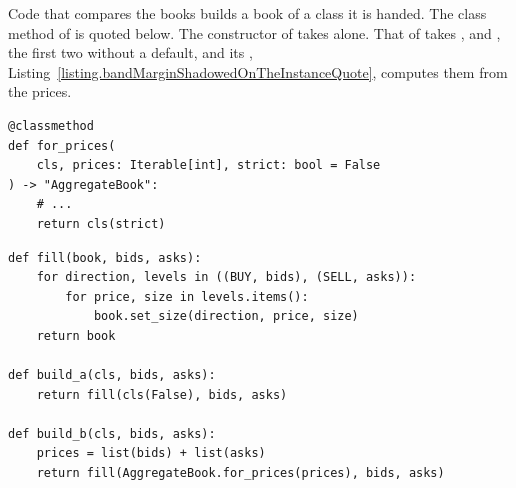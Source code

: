 \begin{question}
\label{question.buildingABookOfAGivenClass}
Code that compares the books builds a book of a class it is handed.
The class method  of  is quoted below.
The constructor of  takes  alone.
That of  takes ,  and ,
the first two without a default,
and its , Listing~\ref{listing.bandMarginShadowedOnTheInstanceQuote},
computes them from the prices.
\begin{lstlisting}[caption={\protect\codehl{unito26.lob.orderbook.AggregateBook.for\_prices}, its docstring elided.}, label=listing.buildingABookOfAGivenClassQuote]
@classmethod
def for_prices(
    cls, prices: Iterable[int], strict: bool = False
) -> "AggregateBook":
    # ...
    return cls(strict)
\end{lstlisting}
\begin{lstlisting}[caption={Three builders}, label=listing.buildingABookOfAGivenClassBuilders]
def fill(book, bids, asks):
    for direction, levels in ((BUY, bids), (SELL, asks)):
        for price, size in levels.items():
            book.set_size(direction, price, size)
    return book

def build_a(cls, bids, asks):
    return fill(cls(False), bids, asks)

def build_b(cls, bids, asks):
    prices = list(bids) + list(asks)
    return fill(AggregateBook.for_prices(prices), bids, asks)


\end{lstlisting}
\end{question}
